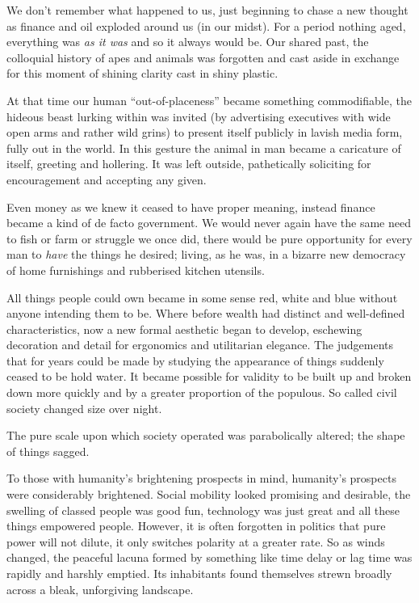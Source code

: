 \documentclass{book}
\begin{document}
We don't remember what happened to us, just beginning to chase a new thought as
finance and oil exploded around us (in our midst). For a period nothing aged,
everything was \emph{as it was} and so it always would be. Our shared past, the
colloquial history of apes and animals was forgotten and cast aside in exchange
for this moment of shining clarity cast in shiny plastic.

At that time our human ``out-of-placeness'' became something commodifiable, the
hideous beast lurking within was invited (by advertising executives with wide
open arms and rather wild grins) to present itself publicly in lavish media
form, fully out in the world. In this gesture the animal in man became a
caricature of itself, greeting and hollering. It was left outside, pathetically
soliciting for encouragement and accepting any given.

Even money as we knew it ceased to have proper meaning, instead finance became
a kind of de facto government. We would never again have the same need to fish
or farm or struggle we once did, there would be pure opportunity for every man
to \emph{have} the things he desired; living, as he was, in a bizarre new
democracy of home furnishings and rubberised kitchen utensils.

All things people could own became in some sense red, white and blue without
anyone intending them to be. Where before wealth had distinct and well-defined
characteristics, now a new formal aesthetic began to develop, eschewing
decoration and detail for ergonomics and utilitarian elegance. The judgements
that for years could be made by studying the appearance of things suddenly
ceased to be hold water.  It became possible for validity to be built up and
broken down more quickly and by a greater proportion of the populous. So called
civil society changed size over night.

The pure scale upon which society operated was parabolically altered; the shape
of things sagged.

To those with humanity's brightening prospects in mind, humanity's prospects
were considerably brightened. Social mobility looked promising and desirable,
the swelling of classed people was good fun, technology was just great and all
these things empowered people. However, it is often forgotten in politics that
pure power will not dilute, it only switches polarity at a greater rate. So as
winds changed, the peaceful lacuna formed by something like time delay or lag
time was rapidly and harshly emptied. Its inhabitants found themselves strewn
broadly across a bleak, unforgiving landscape.
\end{document}
